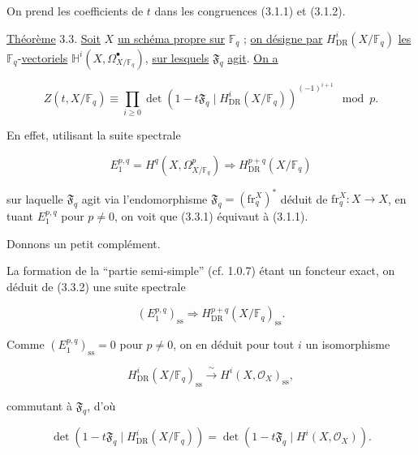On prend les coefficients de $t$ dans les congruences (3.1.1) et (3.1.2).

\underline{Théorème} 3.3. \underline{Soit} $X$ \underline{un schéma propre sur}
$\mathbb F_q$ ; \underline{on désigne par} $H^i_{\mathrm{DR}}(X/\mathbb F_q)$ \underline{les}
$\mathbb F_q$-\underline{vectoriels} $\mathbb H^i(X,\Omega^\bullet_{X/\mathbb F_q})$, \underline{sur lesquels}
$\mathfrak F_q$ \underline{agit}. \underline{On a}

\begin{equation}\tag{3.3.1}
Z(t,X/\mathbb F_q)
\equiv
\prod_{i\geq0}
\det\!\left(1-t\mathfrak F_q\mid
H^i_{\mathrm{DR}}(X/\mathbb F_q)\right)^{(-1)^{i+1}}
\mod p.
\end{equation}

En effet, utilisant la suite spectrale

\begin{equation}\tag{3.3.2}
E_1^{p,q}=H^q(X,\Omega^p_{X/\mathbb F_q})
\Longrightarrow H^{p+q}_{\mathrm{DR}}(X/\mathbb F_q)
\end{equation}

sur laquelle $\mathfrak F_q$ agit via l'endomorphisme
$\mathfrak F_q=(\mathrm{fr}_q^X)^*$ déduit de
$\mathrm{fr}_q^X:X\longrightarrow X$, en tuant $E_1^{p,q}$ pour $p\ne0$, on
voit que (3.3.1) équivaut à (3.1.1).

Donnons un petit complément.

La formation de la ``partie semi-simple'' (cf. 1.0.7) étant un foncteur
exact, on déduit de (3.3.2) une suite spectrale

\begin{equation}\tag{3.3.3}
(E_1^{p,q})_{\mathrm{ss}}
\Longrightarrow H^{p+q}_{\mathrm{DR}}(X/\mathbb F_q)_{\mathrm{ss}}.
\end{equation}

Comme $(E_1^{p,q})_{\mathrm{ss}}=0$ pour $p\ne0$, on en déduit pour tout
$i$ un isomorphisme

\begin{equation}\tag{3.3.4}
H^i_{\mathrm{DR}}(X/\mathbb F_q)_{\mathrm{ss}}
\xrightarrow{\ \sim\ }
H^i(X,\mathcal O_X)_{\mathrm{ss}},
\end{equation}

commutant à $\mathfrak F_q$, d'où

\begin{equation}\tag{3.3.5}
\det\!\left(1-t\mathfrak F_q\mid H^i_{\mathrm{DR}}(X/\mathbb F_q)\right)
=
\det\!\left(1-t\mathfrak F_q\mid H^i(X,\mathcal O_X)\right).
\end{equation}

